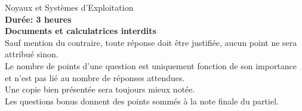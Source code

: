%
%
%
%
%
%
%

%
%

\def\path{../../..}

%
%



\usepackage{graphicx}
\usepackage{float}

\newcommand{\class}{EPITA\_ING2\_2016\_S4 NSE Julio Guerra}
\newcommand{\examdate}{2015}
\newcommand{\timelimit}{3h}
\newcommand{\school}{EPITA}

%
%


%
%

\begin{center}
  {\LARGE Noyaux et Systèmes d'Exploitation}\\
  \vspace{1cm}
  \textbf{Durée: 3 heures}\\
  \textbf{Documents et calculatrices interdits}\\
  \scriptsize{Sauf mention du contraire, toute réponse doit être justifiée, aucun point ne sera attribué sinon.}\\
  \scriptsize{Le nombre de points d'une question est uniquement fonction de son importance et n'est pas lié au nombre de réponses attendues.}\\
  \scriptsize{Une copie bien présentée sera toujours mieux notée.}\\
  \scriptsize{Les questions bonus donnent des points sommés à la note finale du partiel.}
\end{center}
\vspace{1cm}

%
%

